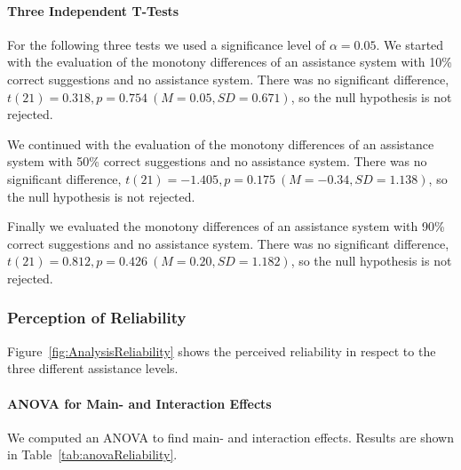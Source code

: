 
		\paragraph{Three Independent T-Tests}
		For the following three tests we used a significance level of \(\alpha = 0.05\). We started with the evaluation of the monotony differences of an assistance system with 10\% correct suggestions and no assistance system. There was no significant difference, \(t(21) = 0.318, p = 0.754\ (M = 0.05, SD = 0.671)\), so the null hypothesis is not rejected.

		We continued with the evaluation of the monotony differences of an assistance system with 50\% correct suggestions and no assistance system. There was no significant difference, \(t(21) = -1.405, p = 0.175\ (M = -0.34, SD = 1.138)\), so the null hypothesis is not rejected.

		Finally we evaluated the monotony differences of an assistance system with 90\% correct suggestions and no assistance system. There was no significant difference, \(t(21) = 0.812, p = 0.426\ (M = 0.20, SD = 1.182)\), so the null hypothesis is not rejected.



	\subsubsection{Perception of Reliability}
		Figure~\ref{fig:AnalysisReliability} shows the perceived reliability in respect to the three different assistance levels.


		\paragraph{\ac{ANOVA} for Main- and Interaction Effects}
		We computed an \ac{ANOVA} to find main- and interaction effects. Results are shown in Table~\ref{tab:anovaReliability}.

